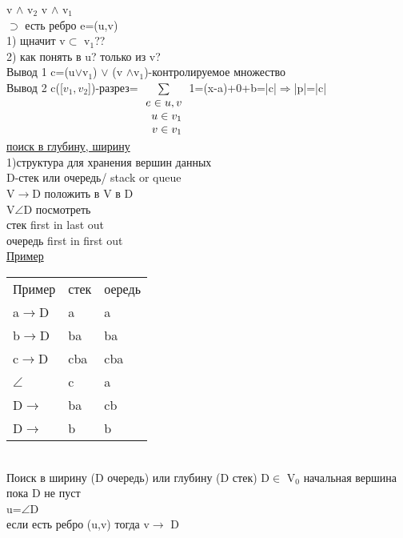 \documentclass{article}
\begin{document}
v $\wedge$ v$_2$ v $\wedge$ v$_1$\\
$\supset$ есть ребро e=(u,v)\\
1) щначит  v$\subset$ v$_1$??\\
2) как понять в u? только из v?\\
Вывод 1 c=(u$\vee$v$_1$) $\vee$ (v $\wedge$v$_1$)-контролируемое множество\\
Вывод 2 c([$v_1,v_2$])-разрез=$\sum \limits_{
\left.
\begin{array}{rcll}
e\in u,v\\
u\in v_1\\
v\in v_1\\
\end{array}
\right.
\\}$1=(x-a)+0+b=|c|$\Rightarrow$|p|=|c|\\
\underline{поиск в глубину, ширину}\\
1)структура для хранения вершин данных\\
D-стек или очередь/ stack or queue\\
V$\rightarrow$D положить в V в D\\
V$\angle$D посмотреть\\
стек first in last out\\
очередь first in first out\\
\underline{Пример}\\
\begin{tabular}{l l l}
Пример&стек&оередь\\
a$\rightarrow$D& a  &a\\
b$\rightarrow$D&ba  &ba\\
c$\rightarrow$D&cba & cba\\
$\angle$&c&a\\
D$\rightarrow$&ba&cb\\
D$\rightarrow$&b&b\\
\end{tabular}\\
Поиск в ширину (D очередь) или глубину (D стек) D$\in$ V$_0$ начальная вершина\\
пока D не пуст\\
u=$\angle$D\\
если есть ребро (u,v) тогда v$\rightarrow$ D\\
\\
\end{document}
